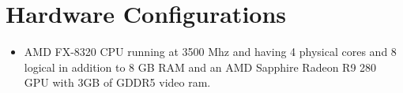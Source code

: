 \chapter{Hardware Configurations}\label{app:HW}
\begin{itemize}
\item AMD FX-8320 \gls{CPU} running at 3500 Mhz and having 4 physical cores and 8 logical in addition to 8 GB RAM and an AMD Sapphire Radeon R9 280 \gls{GPU} with 3GB of GDDR5 video ram. 

\end{itemize}